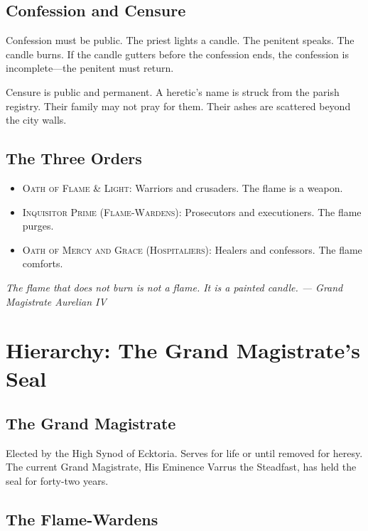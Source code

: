 \documentclass{book}
\newcommand{\citation}[1]{\textcolor{marginalia}{\small\textit{#1}}}
\newcommand{\order}[1]{\textcolor{templelight}{\textsc{#1}}}
\begin{document}

\section{Confession and Censure}

Confession must be public. The priest lights a candle. The penitent speaks. The candle burns. If the candle gutters before the confession ends, the confession is incomplete---the penitent must return.

Censure is public and permanent. A heretic's name is struck from the parish registry. Their family may not pray for them. Their ashes are scattered beyond the city walls.

\section{The Three Orders}

\begin{itemize}
\item \order{Oath of Flame \& Light}: Warriors and crusaders. The flame is a weapon.
\item \order{Inquisitor Prime (Flame-Wardens)}: Prosecutors and executioners. The flame purges.
\item \order{Oath of Mercy and Grace (Hospitaliers)}: Healers and confessors. The flame comforts.
\end{itemize}

\citation{The flame that does not burn is not a flame. It is a painted candle. --- Grand Magistrate Aurelian IV}

\chapter{Hierarchy: The Grand Magistrate's Seal}

\section{The Grand Magistrate}

Elected by the High Synod of Ecktoria. Serves for life or until removed for heresy. The current Grand Magistrate, His Eminence Varrus the Steadfast, has held the seal for forty-two years.

\section{The Flame-Wardens}
\end{document}
